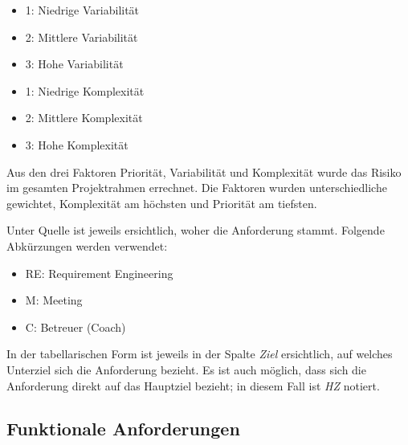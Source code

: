 \begin{itemize}
	\item 1: Niedrige Variabilität
	\item 2: Mittlere Variabilität
	\item 3: Hohe Variabilität
\end{itemize}

\begin{itemize}
	\item 1: Niedrige Komplexität
	\item 2: Mittlere Komplexität
	\item 3: Hohe Komplexität
\end{itemize}

Aus den drei Faktoren Priorität, Variabilität und Komplexität wurde das Risiko im gesamten Projektrahmen errechnet. Die Faktoren wurden unterschiedliche gewichtet, Komplexität am höchsten und Priorität am tiefsten. 

Unter Quelle ist jeweils ersichtlich, woher die Anforderung stammt. Folgende Abkürzungen werden verwendet:
\begin{itemize}
	\item RE: Requirement Engineering
	\item M: Meeting
	\item C: Betreuer (Coach)
\end{itemize}
In der tabellarischen Form ist jeweils in der Spalte \emph{Ziel} ersichtlich, auf welches Unterziel sich die Anforderung bezieht. Es ist auch möglich, dass sich die Anforderung direkt auf das Hauptziel bezieht; in diesem Fall ist \emph{HZ} notiert.

\subsection{Funktionale Anforderungen}
